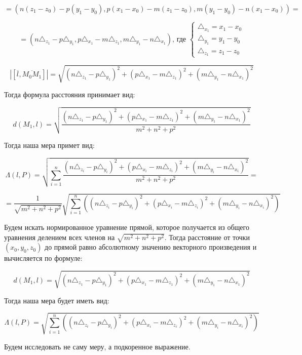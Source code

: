 \documentclass[article,final,14pt]{scrreprt}
\begin{document}
$$= (n (z_1 - z_0) - p (y_1 - y_0), p (x_1 - x_0) - m (z_1 - z_0), m (y_1 - y_0) - n (x_1 - x_0)) = $$

$$ = (n \triangle_{z_1} - p \triangle_{y_1}, p \triangle_{x_1} - m \triangle_{z_1}, m \triangle_{y_1} - n \triangle_{x_1})\text{, где }\begin{cases}
	\triangle_{x_1} = x_1 - x_0 \\
	\triangle_{y_1} = y_1 - y_0 \\
	\triangle_{z_1} = z_1 - z_0
\end{cases}$$

$$|[\overline{\mathit{l}}, \overline{M_0 M_1}]| = \sqrt{(n \triangle_{z_1} - p \triangle_{y_1})^2 + (p \triangle_{x_1} - m \triangle_{z_1})^2 + (m \triangle_{y_1} - n \triangle_{x_1})^2}$$

Тогда формула расстояния принимает вид:

$$d (M_1, \mathit{l}) = \sqrt{\frac{(n \triangle_{z_1} - p \triangle_{y_1})^2 + (p \triangle_{x_1} - m \triangle_{z_1})^2 + (m \triangle_{y_1} - n \triangle_{x_1})^2}{m^2 + n^2 + p^2}}$$

Тогда наша мера примет вид:

$$\Lambda (\mathit{l}, P) = \sqrt{\underset{i=1}{\overset{n}{\sum}} \frac{(n \triangle_{z_i} - p \triangle_{y_i})^2 + (p \triangle_{x_i} - m \triangle_{z_i})^2 + (m \triangle_{y_i} - n \triangle_{x_i})^2}{m^2 + n^2 + p^2} } = $$

$$ = \frac{1}{\sqrt{m^2 + n^2 + p^2}} \sqrt{\underset{i=1}{\overset{n}{\sum}} \left( (n \triangle_{z_i} - p \triangle_{y_i})^2 + (p \triangle_{x_i} - m \triangle_{z_i})^2 + (m \triangle_{y_i} - n \triangle_{x_i})^2 \right)}$$

Будем искать нормированное уравнение прямой, которое получается из общего уравнения делением всех членов на $\sqrt{m^2 + n^2 + p^2}$. Тогда расстояние от точки $(x_0,y_0,z_0)$ до прямой равно абсолютному значению векторного произведения и вычисляется по формуле: 

$$d (M_1, \mathit{l}) = \sqrt{(n \triangle_{z_1} - p \triangle_{y_1})^2 + (p \triangle_{x_1} - m \triangle_{z_1})^2 + (m \triangle_{y_1} - n \triangle_{x_1})^2}$$

Тогда наша мера будет иметь вид:

$$\Lambda (\mathit{l}, P) = \sqrt{\underset{i=1}{\overset{n}{\sum}} \left((n \triangle_{z_i} - p \triangle_{y_i})^2 + (p \triangle_{x_i} - m \triangle_{z_i})^2 + (m \triangle_{y_i} - n \triangle_{x_i})^2 \right)}$$

Будем исследовать не саму меру, а подкоренное выражение.
\end{document}
